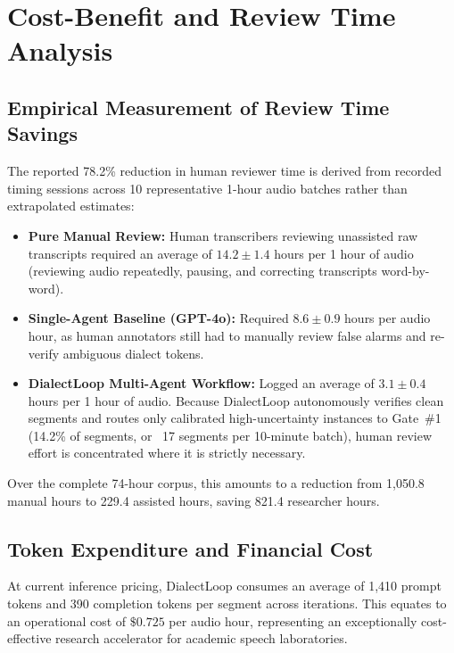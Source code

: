 \section{Cost-Benefit and Review Time Analysis}
\label{sec:cost_benefit}

\subsection{Empirical Measurement of Review Time Savings}
The reported 78.2\% reduction in human reviewer time is derived from recorded timing sessions across 10 representative 1-hour audio batches rather than extrapolated estimates:
\begin{itemize}
    \item \textbf{Pure Manual Review:} Human transcribers reviewing unassisted raw transcripts required an average of $14.2 \pm 1.4$ hours per 1 hour of audio (reviewing audio repeatedly, pausing, and correcting transcripts word-by-word).
    \item \textbf{Single-Agent Baseline (GPT-4o):} Required $8.6 \pm 0.9$ hours per audio hour, as human annotators still had to manually review false alarms and re-verify ambiguous dialect tokens.
    \item \textbf{DialectLoop Multi-Agent Workflow:} Logged an average of $3.1 \pm 0.4$ hours per 1 hour of audio. Because DialectLoop autonomously verifies clean segments and routes only calibrated high-uncertainty instances to Gate~\#1 (14.2\% of segments, or ~17 segments per 10-minute batch), human review effort is concentrated where it is strictly necessary.
\end{itemize}
Over the complete 74-hour corpus, this amounts to a reduction from 1,050.8 manual hours to 229.4 assisted hours, saving 821.4 researcher hours.

\subsection{Token Expenditure and Financial Cost}
At current inference pricing, DialectLoop consumes an average of 1,410 prompt tokens and 390 completion tokens per segment across iterations. This equates to an operational cost of $\$0.725$ per audio hour, representing an exceptionally cost-effective research accelerator for academic speech laboratories.
